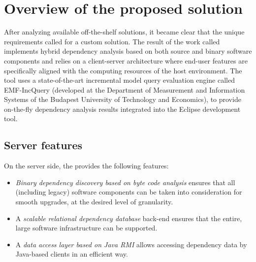 \section{Overview of the proposed solution}
After analyzing available off-the-shelf solutions, it became clear that the
unique requirements called for a custom solution. The result of the work called
\ptool{} implements hybrid dependency analysis based on both source and binary
software components and relies on a client-server architecture where end-user
features are specifically aligned with the computing resources of the host
environment. The tool uses a state-of-the-art incremental model query evaluation
engine called EMF-IncQuery (developed at the Department of Measurement and
Information Systems of the Budapest University of Technology and Economics), to
provide on-the-fly dependency analysis results integrated into the Eclipse
development tool.

\subsection{Server features}
On the server side, the \ptool{} provides the following features:
\begin{itemize}
  \item \emph{Binary dependency discovery based on byte code analysis} ensures
  that all (including legacy) software components can be taken into
  consideration for smooth upgrades, at the desired level of granularity.
  \item A \emph{scalable relational dependency database} back-end ensures that
  the entire, large software infrastructure can be supported.
  \item A \emph{data access layer based on Java RMI} allows accessing dependency
  data by Java-based clients in an efficient way.
\end{itemize}

